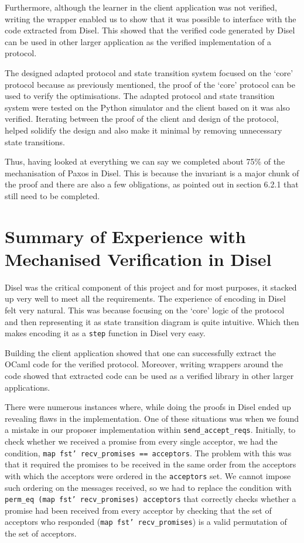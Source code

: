 Furthermore, although the learner in the client application was not verified,
writing the wrapper enabled us to show that it was possible to interface with
the code extracted from Disel. This showed that the verified code generated by
Disel can be used in other larger application as the verified implementation of
a protocol.

The designed adapted protocol and state transition system focused on
the `core' protocol because as previously mentioned, the proof of the `core'
protocol can be used to verify the optimisations. The adapted protocol and
state transition system were tested on the Python simulator and the client
based on it was also verified. Iterating between the proof of the client
and design of the protocol, helped solidify the design and also make it
minimal by removing unnecessary state transitions.

Thus, having looked at everything we can say we completed about 75\% of
the mechanisation of Paxos in Disel. This is because the invariant is a major chunk of
the proof and there are also a few obligations, as pointed out in section 6.2.1
that still need to be completed.

\section{Summary of Experience with Mechanised Verification in Disel}
Disel was the critical component of this project and for most purposes, it
stacked up very well to meet all the requirements.
The experience of encoding in Disel felt very natural. This was because
focusing on the `core' logic of the protocol and then representing it
as state transition diagram is quite intuitive. Which then makes
encoding it as a \texttt{step} function in Disel very easy.

Building the client application showed that one can successfully extract
the OCaml code for the verified protocol. Moreover, writing wrappers
around the code showed that extracted code can be used as a verified library
in other larger applications.

There were numerous instances where, while doing the proofs in Disel
ended up revealing flaws in the implementation. One of these situations was
when we found a mistake in our proposer implementation within
\texttt{send\_accept\_reqs}. Initially, to check
whether we received a promise from every single acceptor, we had the condition,
\texttt{map fst' recv\_promises == acceptors}. The problem with this was that
it required the promises to be received in the same order from the acceptors
with which the acceptors were ordered in the \texttt{acceptors} set. We cannot impose
such ordering on the messages received, so we had to replace the condition
with \texttt{perm\_eq (map fst' recv\_promises) acceptors} that correctly checks
whether a promise had been received from every acceptor by checking that
the set of acceptors who responded (\texttt{map fst' recv\_promises}) is
a valid permutation of the set of acceptors.

